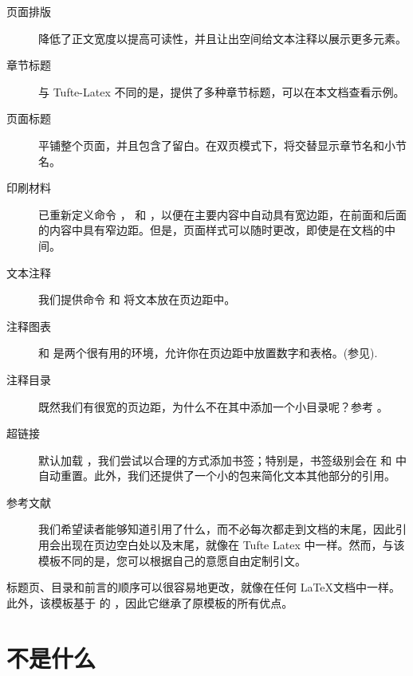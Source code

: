 \begin{description}
	\item[页面排版] 降低了正文宽度以提高可读性，并且让出空间给文本注释以展示更多元素。
	\item[章节标题] 与 Tufte-Latex 不同的是，提供了多种章节标题，可以在本文档查看示例。
	\item[页面标题] 平铺整个页面，并且包含了留白。在双页模式下，将交替显示章节名和小节名。
	\item[印刷材料] 已重新定义命令 ， 和 ，以便在主要内容中自动具有宽边距，在前面和后面的内容中具有窄边距。但是，页面样式可以随时更改，即使是在文档的中间。
	\item[文本注释] 我们提供命令  和  将文本放在页边距中。
	\item[注释图表]  和  是两个很有用的环境，允许你在页边距中放置数字和表格。(参见).
	\item[注释目录] 既然我们有很宽的页边距，为什么不在其中添加一个小目录呢？参考 。
	\item[超链接] 默认加载 ，我们尝试以合理的方式添加书签；特别是，书签级别会在  和  中自动重置。此外，我们还提供了一个小的包来简化文本其他部分的引用。
	\item[参考文献] 我们希望读者能够知道引用了什么，而不必每次都走到文档的末尾，因此引用会出现在页边空白处以及末尾，就像在 Tufte Latex 中一样。然而，与该模板不同的是，您可以根据自己的意愿自由定制引文。
\end{description}


标题页、目录和前言的顺序可以很容易地更改，就像在任何 \LaTeX 文档中一样。此外，该模板基于 \KOMAScript 的 ，因此它继承了原模板的所有优点。

\section{不是什么}

